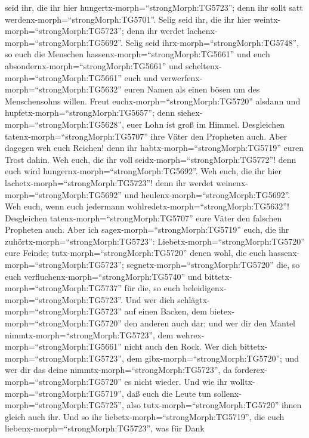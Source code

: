 seid ihr, die ihr hier hungertx-morph=``strongMorph:TG5723''; denn ihr
sollt satt werdenx-morph=``strongMorph:TG5701''. Selig seid ihr, die ihr
hier weintx-morph=``strongMorph:TG5723''; denn ihr werdet
lachenx-morph=``strongMorph:TG5692''.  Selig seid
ihrx-morph=``strongMorph:TG5748'', so euch die Menschen
hassenx-morph=``strongMorph:TG5661'' und euch
absondernx-morph=``strongMorph:TG5661'' und
scheltenx-morph=``strongMorph:TG5661'' euch und
verwerfenx-morph=``strongMorph:TG5632'' euren Namen als einen bösen um
des Menschensohns willen.  Freut
euchx-morph=``strongMorph:TG5720'' alsdann und
hupfetx-morph=``strongMorph:TG5657''; denn
siehex-morph=``strongMorph:TG5628'', euer Lohn ist groß im Himmel.
Desgleichen tatenx-morph=``strongMorph:TG5707'' ihre Väter den Propheten
auch.  Aber dagegen weh euch Reichen! denn ihr
habtx-morph=``strongMorph:TG5719'' euren Trost dahin.  Weh
euch, die ihr voll seidx-morph=``strongMorph:TG5772''! denn euch wird
hungernx-morph=``strongMorph:TG5692''. Weh euch, die ihr hier
lachetx-morph=``strongMorph:TG5723''! denn ihr werdet
weinenx-morph=``strongMorph:TG5692'' und
heulenx-morph=``strongMorph:TG5692''.  Weh euch, wenn euch
jedermann wohlredetx-morph=``strongMorph:TG5632''! Desgleichen
tatenx-morph=``strongMorph:TG5707'' eure Väter den falschen Propheten
auch.  Aber ich sagex-morph=``strongMorph:TG5719'' euch,
die ihr zuhörtx-morph=``strongMorph:TG5723'':
Liebetx-morph=``strongMorph:TG5720'' eure Feinde;
tutx-morph=``strongMorph:TG5720'' denen wohl, die euch
hassenx-morph=``strongMorph:TG5723''; 
segnetx-morph=``strongMorph:TG5720'' die, so euch
verfluchenx-morph=``strongMorph:TG5740'' und
bittetx-morph=``strongMorph:TG5737'' für die, so euch
beleidigenx-morph=``strongMorph:TG5723''.  Und wer dich
schlägtx-morph=``strongMorph:TG5723'' auf einen Backen, dem
bietex-morph=``strongMorph:TG5720'' den anderen auch dar; und wer dir
den Mantel nimmtx-morph=``strongMorph:TG5723'', dem
wehrex-morph=``strongMorph:TG5661'' nicht auch den Rock. 
Wer dich bittetx-morph=``strongMorph:TG5723'', dem
gibx-morph=``strongMorph:TG5720''; und wer dir das deine
nimmtx-morph=``strongMorph:TG5723'', da
forderex-morph=``strongMorph:TG5720'' es nicht wieder.  Und
wie ihr wolltx-morph=``strongMorph:TG5719'', daß euch die Leute tun
sollenx-morph=``strongMorph:TG5725'', also
tutx-morph=``strongMorph:TG5720'' ihnen gleich auch ihr. 
Und so ihr liebetx-morph=``strongMorph:TG5719'', die euch
liebenx-morph=``strongMorph:TG5723'', was für Dank
